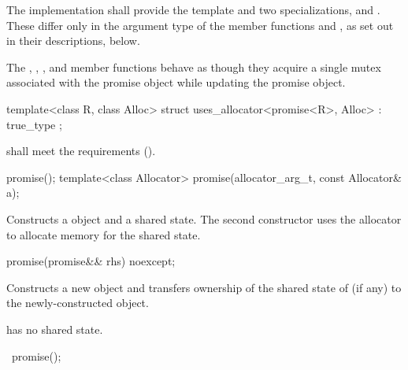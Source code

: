 \pnum
The implementation shall provide the template  and two specializations,
 and . These differ only in the argument type
of the member functions  and ,
as set out in their descriptions, below.

\pnum
The , , ,
and  member functions behave as though
they acquire a single mutex associated with the promise object while updating the
promise object.

%
\begin{itemdecl}
template<class R, class Alloc>
  struct uses_allocator<promise<R>, Alloc>
    : true_type { };
\end{itemdecl}

\begin{itemdescr}
\pnum
\requires {} shall meet the 
requirements ().
\end{itemdescr}


%
\begin{itemdecl}
promise();
template<class Allocator>
  promise(allocator_arg_t, const Allocator& a);
\end{itemdecl}

\begin{itemdescr}
\pnum
\effects Constructs a  object and a shared state. The second
constructor uses the allocator  to allocate memory for the shared
state.
\end{itemdescr}

%
\begin{itemdecl}
promise(promise&& rhs) noexcept;
\end{itemdecl}

\begin{itemdescr}
\pnum
\effects Constructs a new  object and transfers ownership of the shared state
of  (if any) to the newly-constructed object.

\pnum
\ensures {} has no shared state.
\end{itemdescr}

%
\begin{itemdecl}
~promise();
\end{itemdecl}

